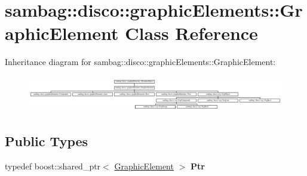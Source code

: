 \hypertarget{classsambag_1_1disco_1_1graphic_elements_1_1_graphic_element}{
\section{sambag::disco::graphicElements::GraphicElement Class Reference}
\label{classsambag_1_1disco_1_1graphic_elements_1_1_graphic_element}
}
Inheritance diagram for sambag::disco::graphicElements::GraphicElement:\begin{figure}[H]
\begin{center}
\leavevmode
\includegraphics[height=1.592719cm]{classsambag_1_1disco_1_1graphic_elements_1_1_graphic_element}
\end{center}
\end{figure}
\subsection*{Public Types}
\begin{DoxyCompactItemize}
\item 
\hypertarget{classsambag_1_1disco_1_1graphic_elements_1_1_graphic_element_aaf40beb610d9ba8709007873c30fd4ed}{
typedef boost::shared\_\-ptr$<$ \hyperlink{classsambag_1_1disco_1_1graphic_elements_1_1_graphic_element}{GraphicElement} $>$ {\bfseries Ptr}}
\label{classsambag_1_1disco_1_1graphic_elements_1_1_graphic_element_aaf40beb610d9ba8709007873c30fd4ed}

\end{DoxyCompactItemize}
